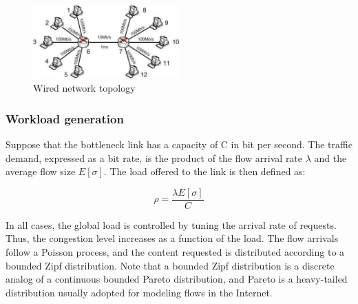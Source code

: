 \documentclass[preprint,12pt]{elsarticle}
\begin{document}
\begin{figure}[ht!]
  \centering
  \includegraphics[width=0.5\textwidth]{./fig/wired/topology/topology}
  \caption{Wired network topology}
  \label{fig:wired_topology}
\end{figure}



\subsubsection{Workload generation}\label{sec:workload}
Suppose that the bottleneck link has a capacity of C in bit per second. The traffic demand, expressed as a bit rate, is the product of the flow arrival rate $\lambda$ and the average flow size $E[\sigma]$. The load offered to the link is then defined as:

\begin{equation}
\rho = \frac{\lambda E[\sigma]}{C}
\end{equation}

In all cases, the global load is controlled by tuning the arrival rate of requests. Thus, the congestion level increases as a function of the load. The flow arrivals follow a Poisson process, and the content requested is distributed according to a bounded Zipf distribution. Note that a bounded Zipf distribution is a discrete analog of a continuous bounded Pareto distribution, and Pareto is a heavy-tailed distribution usually adopted for modeling flows in the Internet. %
 
\end{document}
